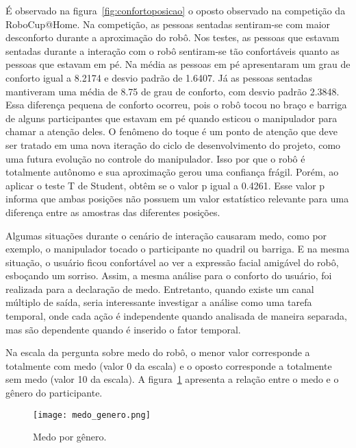 É observado na figura~\ref{fig:confortoposicao} o oposto observado na competição da RoboCup@Home. Na competição, as pessoas sentadas sentiram-se com maior desconforto durante a aproximação do robô. Nos testes, as pessoas que estavam sentadas durante a interação com o robô sentiram-se tão confortáveis quanto as pessoas que estavam em pé. Na média as pessoas em pé apresentaram um grau de conforto igual a 8.2174 e desvio padrão de 1.6407. Já as pessoas sentadas mantiveram uma média de 8.75 de grau de conforto, com desvio padrão 2.3848. Essa diferença pequena de conforto ocorreu, pois o robô tocou no braço e barriga de alguns participantes que estavam em pé quando esticou o manipulador para chamar a atenção deles. O fenômeno do toque é um ponto de atenção que deve ser tratado em uma nova iteração do ciclo de desenvolvimento do projeto, como uma futura evolução no controle do manipulador. Isso por que o robô é totalmente autônomo e sua aproximação gerou uma confiança frágil. Porém, ao aplicar o teste T de Student, obtêm se o valor p igual a 0.4261. Esse valor p informa que ambas posições não possuem um valor estatístico relevante para uma diferença entre as amostras das diferentes posições. 

Algumas situações durante o cenário de interação causaram medo, como por exemplo, o manipulador tocado o participante no quadril ou barriga. E na mesma situação, o usuário ficou confortável ao ver a expressão facial amigável do robô, esboçando um sorriso. Assim, a mesma análise para o conforto do usuário, foi realizada para a declaração de medo. Entretanto, quando existe um canal múltiplo de saída, seria interessante investigar a análise como uma tarefa temporal, onde cada ação é independente quando analisada de maneira separada, mas são dependente quando é inserido o fator temporal. 

Na escala da pergunta sobre medo do robô, o menor valor corresponde a totalmente com medo (valor 0 da escala) e o oposto corresponde a totalmente sem medo (valor 10 da escala). A figura~\ref{fig:medogenero} apresenta a relação entre o medo e o gênero do participante.

\begin{figure}[ht!]
	\centering
	\begin{minipage}{0.65\textwidth}
		\caption{Medo por gênero.}
		\texttt{[image: medo\_genero.png]}
		\label{fig:medogenero}
	\end{minipage}
\end{figure}

